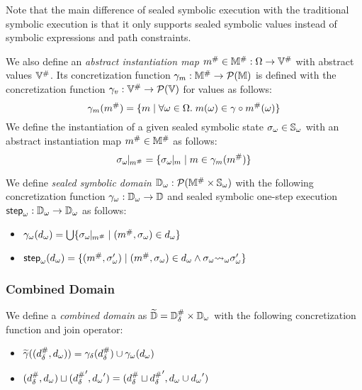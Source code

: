 Note that the main difference of sealed symbolic execution with the traditional
symbolic execution is that it only supports sealed symbolic values instead of
symbolic expressions and path constraints.

We also define an \textit{abstract instantiation map} ${m}^{\#} \in {\mathbb{M}}^{\#}:
\Omega \rightarrow {\mathbb{V}}^{\#}$ with abstract values ${\mathbb{V}}^{\#}$.  Its
concretization function $\gamma_m: {\mathbb{M}}^{\#} \rightarrow
\mathcal{P}(\mathbb{M})$ is defined with the concretization function $\gamma_v:
{\mathbb{V}}^{\#} \rightarrow \mathcal{P}(\mathbb{V})$ for values as follows:
\[
  \gamma_m({m}^{\#}) = \{
    m \mid \forall \omega \in \Omega. \;
    m(\omega) \in \gamma \circ {m}^{\#}(\omega)
  \}
\]
We define the instantiation of a given sealed symbolic state ${\sigma}_\omega \in
{\mathbb{S}}_\omega$ with an abstract instantiation map ${m}^{\#} \in {\mathbb{M}}^{\#}$ as
follows:
\[
  \instant{\symbst}{\absimap} = \{ \instant{\symbst}{\imap} \mid \imap \in
  \imapgamma(\absimap) \}
\]

\begin{definition}
  We define \textit{sealed symbolic domain} ${\mathbb{D}}_\omega: \mathcal{P}({\mathbb{M}}^{\#}
  \times {\mathbb{S}}_\omega)$ with the following concretization function ${\gamma}_\omega:
  {\mathbb{D}}_\omega \rightarrow \mathbb{D}$ and sealed symbolic one-step execution ${\textsf{step}}_\omega:
  {\mathbb{D}}_\omega \rightarrow {\mathbb{D}}_\omega$ as follows:
  \begin{itemize}
    \item \(
      {\gamma}_\omega({{d}_\omega}) = 
      \bigcup \{ {\sigma}_\omega\!\!\mid\!\!_{{m}^{\#}} \mid ({m}^{\#}, {\sigma}_\omega) \in
      {{d}_\omega}\}
    \)
    \item \(
      {\textsf{step}}_\omega({{d}_\omega}) = \{ ({m}^{\#}, {\sigma}_\omega') \mid ({m}^{\#}, {\sigma}_\omega)
      \in {{d}_\omega} \wedge {\sigma}_\omega {\leadsto}_\omega {\sigma}_\omega' \}
    \)
  \end{itemize}
\end{definition}


\subsubsection{Combined Domain}

\begin{definition}
  We define a \textit{combined domain} as $\widetilde{\mathbb{D}} = {\mathbb{D}}^{\#}_\delta \times {\mathbb{D}}_\omega$
  with the following concretization function and join operator:
  \begin{itemize}
    \item \(
      \widetilde{\gamma}(({{d}^{\#}_\delta}, {{d}_\omega})) = \gamma_\delta({{d}^{\#}_\delta}) \cup
      {\gamma}_\omega({{d}_\omega})
    \)
    \item \(
      ({{d}^{\#}_\delta}, {{d}_\omega}) \sqcup ({{{d}^{\#}_\delta}}', {{d}_\omega}') = ({{d}^{\#}_\delta} \sqcup
      {{{d}^{\#}_\delta}}', {{d}_\omega} \cup {{d}_\omega}')
    \)
  \end{itemize}
\end{definition}

